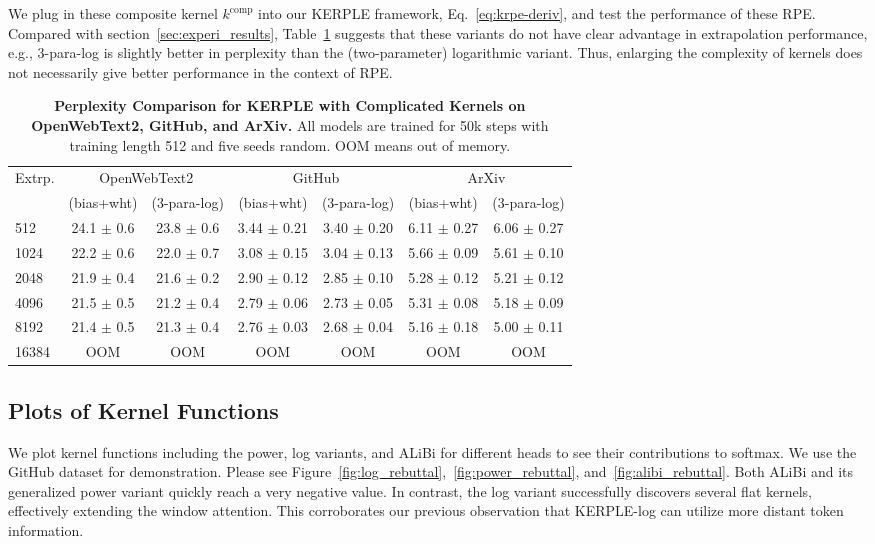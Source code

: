 We plug in these composite kernel $k^{\text{comp}}$ into our KERPLE framework, Eq.~\eqref{eq:krpe-deriv}, and test the performance of these RPE. Compared with section~\ref{sec:experi_results}, Table~\ref{tab:add_experi} suggests that these variants do not have clear advantage in extrapolation performance, e.g., 3-para-log is slightly better in perplexity than the (two-parameter) logarithmic variant. Thus, enlarging the complexity of kernels does not necessarily give better performance in the context of RPE.

\begin{table}[!ht]
    \setlength{\tabcolsep}{4pt}
    \centering
    \caption{\textbf{Perplexity Comparison for KERPLE with Complicated Kernels on OpenWebText2, GitHub, and ArXiv.} All models are trained for 50k steps with training length 512 and five seeds random. OOM means out of memory.}
    \begin{tabular}{@{\extracolsep{3pt}}lcccccc}
    \hline\hline
      \multirow{2}{*}{Extrp.} & \multicolumn{2}{c}{OpenWebText2} &\multicolumn{2}{c}{GitHub} &\multicolumn{2}{c}{ArXiv}\\
      \cline{2-3} \cline{4-5} \cline{6-7}
     &  (bias+wht) & (3-para-log) &  (bias+wht) & (3-para-log) & (bias+wht) & (3-para-log) \\ \hline
    512 & 24.1 $\pm$ 0.6 & 23.8 $\pm$ 0.6  & 3.44 $\pm$ 0.21 & 3.40 $\pm$ 0.20 & 6.11 $\pm$ 0.27 & 6.06 $\pm$ 0.27\\
1024 & 22.2 $\pm$ 0.6 & 22.0 $\pm$ 0.7 & 3.08 $\pm$ 0.15 & 3.04 $\pm$ 0.13 & 5.66 $\pm$ 0.09 & 5.61 $\pm$ 0.10\\
2048 & 21.9 $\pm$ 0.4 & 21.6 $\pm$ 0.2 & 2.90 $\pm$ 0.12 & 2.85 $\pm$ 0.10 & 5.28 $\pm$ 0.12 & 5.21 $\pm$ 0.12\\
4096 & 21.5 $\pm$ 0.5 & 21.2 $\pm$ 0.4 & 2.79 $\pm$ 0.06 & 2.73 $\pm$ 0.05 & 5.31 $\pm$ 0.08 & 5.18 $\pm$ 0.09\\
8192 & 21.4 $\pm$ 0.5 & 21.3 $\pm$ 0.4 & 2.76 $\pm$ 0.03 & 2.68 $\pm$ 0.04 & 5.16 $\pm$ 0.18 & 5.00 $\pm$ 0.11\\
16384 & OOM & OOM & OOM & OOM & OOM & OOM\\
    \hline\hline
    \end{tabular}
    \label{tab:add_experi}
\end{table}

\subsection{Plots of Kernel Functions}
We plot kernel functions including the power, log variants, and ALiBi for different heads to see their contributions to softmax. We use the GitHub dataset for demonstration. Please see Figure~\ref{fig:log_rebuttal},~\ref{fig:power_rebuttal}, and~\ref{fig:alibi_rebuttal}. Both ALiBi and its generalized power variant quickly reach a very negative value. In contrast, the log variant successfully discovers several flat kernels, effectively extending the window attention. This corroborates our previous observation that KERPLE-log can utilize more distant token information.

